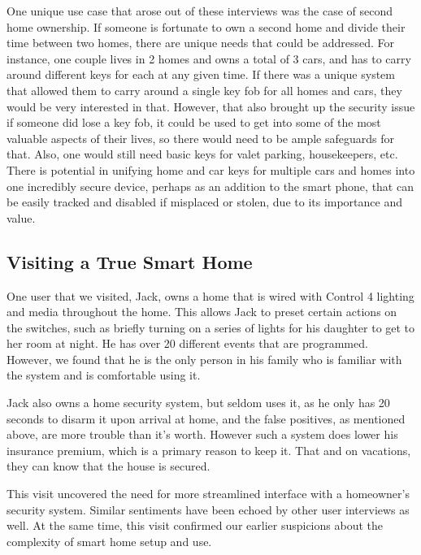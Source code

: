 One unique use case that arose out of these interviews was the case of second home ownership. If someone is fortunate to own a second home and divide their time between two homes, there are unique needs that could be addressed. For instance, one couple lives in 2 homes and owns a total of 3 cars, and has to carry around different keys for each at any given time. If there was a unique system that allowed them to carry around a single key fob for all homes and cars, they would be very interested in that. However, that also brought up the security issue if someone did lose a key fob, it could be used to get into some of the most valuable aspects of their lives, so there would need to be ample safeguards for that. Also, one would still need basic keys for valet parking, housekeepers, etc. There is potential in unifying home and car keys for multiple cars and homes into one incredibly secure device, perhaps as an addition to the smart phone, that can be easily tracked and disabled if misplaced or stolen, due to its importance and value.

\subsection{Visiting a True Smart Home}

One user that we visited, Jack, owns a home that is wired with Control 4 lighting and media throughout the home. This allows Jack to preset certain actions on the switches, such as briefly turning on a series of lights for his daughter to get to her room at night. He has over 20 different events that are programmed. However, we found that he is the only person in his family who is familiar with the system and is comfortable using it.

Jack also owns a home security system, but seldom uses it, as he only has 20 seconds to disarm it upon arrival at home, and the false positives, as mentioned above, are more trouble than it's worth. However such a system does lower his insurance premium, which is a primary reason to keep it. That and on vacations, they can know that the house is secured.

This visit uncovered the need for more streamlined interface with a homeowner's security system. Similar sentiments have been echoed by other user interviews as well. At the same time, this visit confirmed our earlier suspicions about the complexity of smart home setup and use.

